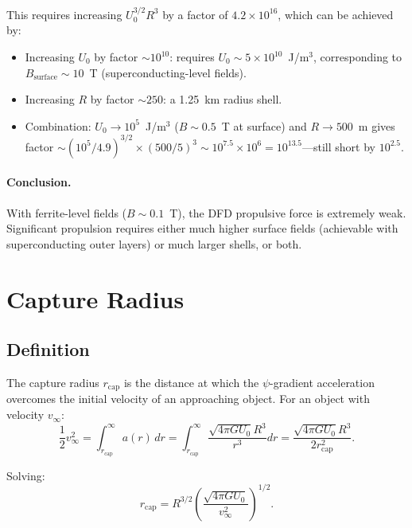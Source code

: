 \documentclass[amsmath,amssymb,aps,prd,superscriptaddress,nofootinbib]{revtex4-2}
\begin{document}
This requires increasing $U_0^{3/2} R^3$ by a factor of $4.2 \times 10^{16}$,
which can be achieved by:
\begin{itemize}
\item Increasing $U_0$ by factor $\sim 10^{10}$: requires
  $U_0 \sim 5 \times 10^{10}$~J/m$^3$, corresponding to
  $B_\text{surface} \sim 10$~T (superconducting-level fields).
\item Increasing $R$ by factor $\sim 250$: a 1.25~km radius shell.
\item Combination: $U_0 \to 10^5$~J/m$^3$ ($B \sim 0.5$~T at surface)
  and $R \to 500$~m gives factor $\sim (10^5/4.9)^{3/2} \times (500/5)^3
  \sim 10^{7.5} \times 10^6 = 10^{13.5}$---still short by $10^{2.5}$.
\end{itemize}

\paragraph{Conclusion.} With ferrite-level fields ($B \sim 0.1$~T), the
DFD propulsive force is extremely weak. Significant propulsion requires
either much higher surface fields (achievable with superconducting
outer layers) or much larger shells, or both.

\section{Capture Radius}\label{sec:capture}

\subsection{Definition}

The capture radius $r_\text{cap}$ is the distance at which the
$\psi$-gradient acceleration overcomes the initial velocity of an
approaching object. For an object with velocity $v_\infty$:
\begin{equation}
\frac{1}{2}v_\infty^2 = \int_{r_\text{cap}}^\infty a(r) \, dr
= \int_{r_\text{cap}}^\infty \frac{\sqrt{4\pi G U_0} R^3}{r^3} dr
= \frac{\sqrt{4\pi G U_0} R^3}{2 r_\text{cap}^2}.
\end{equation}

Solving:
\begin{equation}\label{eq:capture}
\boxed{
r_\text{cap} = R^{3/2} \left(\frac{\sqrt{4\pi G U_0}}{v_\infty^2}\right)^{1/2}.
}
\end{equation}
\end{document}

